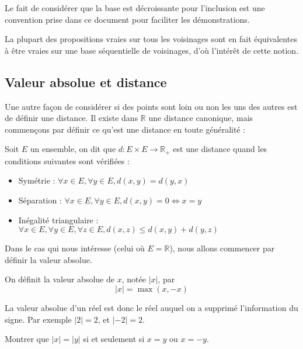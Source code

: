 \begin{rmk}
    Le fait de considérer que la base est décroissante pour l'inclusion est une convention prise dans ce document pour faciliter les démonstrations.
\end{rmk}

La plupart des propositions \og vraies sur tous les voisinages\fg{} sont en fait équivalentes à être vraies sur une base séquentielle de voisinages, d'où l'intérêt de cette notion.

\subsection{Valeur absolue et distance}

Une autre façon de considérer si des points sont loin ou non les uns des autres est de définir une distance. Il existe dans $\mathbb R$ une distance canonique, mais commençons par définir ce qu'est une distance en toute généralité :

\begin{defi}[Distance]
    Soit $E$ un ensemble, on dit que $d : E \times E \to \mathbb R_+$ est une distance quand les conditions suivantes sont vérifiées :
    \begin{itemize}[label=$\bullet$]
        \item Symétrie : $\forall x\in E, \forall y \in E, d(x,y)=d(y,x)$
        \item Séparation : $\forall x\in E, \forall y \in E, d(x,y) = 0 \iff x=y$
        \item Inégalité triangulaire : $\forall x \in E, \forall y \in E, \forall z \in E, d(x,z) \leq d(x,y)+d(y,z)$
    \end{itemize}
\end{defi}

Dans le cas qui nous intéresse (celui où $E=\mathbb R$), nous allons commencer par définir la valeur absolue.

\begin{defi}
    On définit la valeur absolue de $x$, notée $|x|$, par $$|x| = \max(x,-x)$$
\end{defi}

La valeur absolue d'un réel est donc le réel auquel on a supprimé l'information du signe. Par exemple $|2|=2$, et $|-2| = 2$.

\begin{exo}
    Montrer que $|x|=|y|$ si et seulement si $x=y$ ou $x=-y$.
\end{exo}

